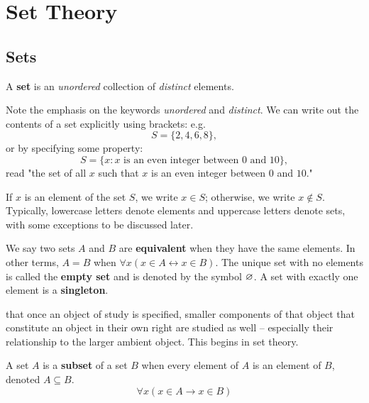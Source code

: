 \chapter{Set Theory}\label{ch:set}

    \section{Sets}
        \begin{definition}[Set]\label{def:set}
            A \textbf{set} is an \emph{unordered} collection of \emph{distinct} elements.
        \end{definition}

        Note the emphasis on the keywords \emph{unordered}  and \emph{distinct}.
        We can write out the contents of a set explicitly using brackets: e.g. $$S = \{2,4,6,8 \},$$ or by specifying some property: $$S = \{x: x \text{ is an even integer between $0$ and $10$}\},$$ read "the set of all $x$ such that $x$ is an even integer between $0$ and $10$."

        If $x$ is an element of the set $S$, we write $x \in S$; otherwise, we write $x \not\in S$. Typically, lowercase letters denote elements and uppercase letters denote sets, with some exceptions to be discussed later.

        We say two sets $A$ and $B$ are \textbf{equivalent} when they have the same elements. In other terms, $A=B$ when $\forall x(x\in A \longleftrightarrow x\in B)$. The unique set with no elements is called the \textbf{empty set} and is denoted by the symbol $\varnothing$. A set with exactly one element is a \textbf{singleton}.

         that once an object of study is specified, smaller components of that object that constitute an object in their own right are studied as well -- especially their relationship to the larger ambient object. This begins in set theory.

        \begin{definition}[Subset]\label{def:subset}
            A set $A$ is a \textbf{subset} of a set $B$ when every element of $A$ is an element of $B$, denoted $A \subseteq B$. $$\forall x (x \in A \longrightarrow x\in B)$$
        \end{definition}


